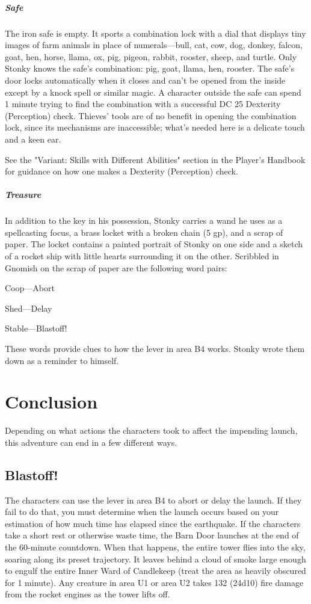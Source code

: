 \documentclass[10pt,a4paper,twoside,bg=print,twocolumn,openany,nodeprecatedcode]{dndbook}
\begin{document}
\subparagraph{Safe}
The iron safe is empty. It sports a combination lock with a dial that displays tiny images of farm animals in place of numerals—bull, cat, cow, dog, donkey, falcon, goat, hen, horse, llama, ox, pig, pigeon, rabbit, rooster, sheep, and turtle. Only Stonky knows the safe's combination: pig, goat, llama, hen, rooster. The safe's door locks automatically when it closes and can't be opened from the inside except by a knock spell or similar magic. A character outside the safe can spend 1 minute trying to find the combination with a successful DC 25 Dexterity (Perception) check. Thieves' tools are of no benefit in opening the combination lock, since its mechanisms are inaccessible; what's needed here is a delicate touch and a keen ear.

See the "Variant: Skills with Different Abilities" section in the Player's Handbook for guidance on how one makes a Dexterity (Perception) check.

\subparagraph{Treasure}
In addition to the key in his possession, Stonky carries a wand he uses as a spellcasting focus, a brass locket with a broken chain (5 gp), and a scrap of paper. The locket contains a painted portrait of Stonky on one side and a sketch of a rocket ship with little hearts surrounding it on the other. Scribbled in Gnomish on the scrap of paper are the following word pairs:

\begin{DndSidebar}[float=!b]{}
Coop—Abort



Shed—Delay



Stable—Blastoff!



\end{DndSidebar}

These words provide clues to how the lever in area B4 works. Stonky wrote them down as a reminder to himself.

\section{Conclusion}
Depending on what actions the characters took to affect the impending launch, this adventure can end in a few different ways.

\subsection{Blastoff!}
The characters can use the lever in area B4 to abort or delay the launch. If they fail to do that, you must determine when the launch occurs based on your estimation of how much time has elapsed since the earthquake. If the characters take a short rest or otherwise waste time, the Barn Door launches at the end of the 60-minute countdown. When that happens, the entire tower flies into the sky, soaring along its preset trajectory. It leaves behind a cloud of smoke large enough to engulf the entire Inner Ward of Candlekeep (treat the area as heavily obscured for 1 minute). Any creature in area U1 or area U2 takes 132 (24d10) fire damage from the rocket engines as the tower lifts off.
\end{document}
